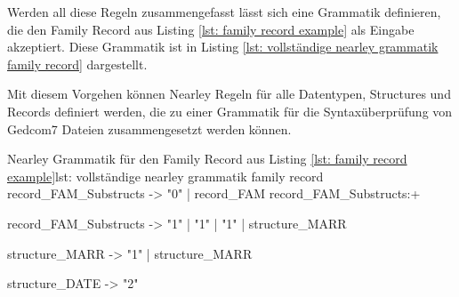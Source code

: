 \vspace{1em}
Werden all diese Regeln zusammengefasst lässt sich eine Grammatik definieren, die den Family Record aus Listing \ref{lst: family record example} als Eingabe akzeptiert. Diese Grammatik ist in Listing \ref{lst: vollständige nearley grammatik family record} dargestellt.

Mit diesem Vorgehen können Nearley Regeln für alle Datentypen, Structures und Records definiert werden, die zu einer Grammatik für die Syntaxüberprüfung von Gedcom7 Dateien zusammengesetzt werden können.
\vspace{1em}
\begin{javascript}{Nearley Grammatik für den Family Record aus Listing \ref{lst: family record example}}{lst: vollständige nearley grammatik family record}
	record_FAM_Substructs
		-> "0"  %
		|  record_FAM  record_FAM_Substructs:+
		
	record_FAM_Substructs 
		-> "1"  %
		|  "1"  %
		|  "1"  %
		|  structure_MARR 
		
	structure_MARR
		-> "1"  %
		|  structure_MARR  
		
	structure_DATE
		-> "2" %
\end{javascript}
\vspace{1em}

